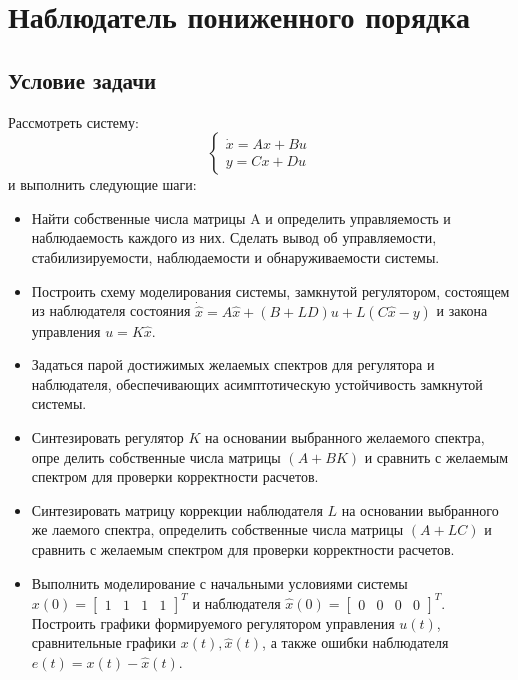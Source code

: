\chapter{Наблюдатель пониженного порядка}
\label{ch:chap4}

\section{Условие задачи}

Рассмотреть систему:
$$
  \begin{cases}
    \dot{x} = Ax + Bu \\
    y = Cx + Du
  \end{cases}
$$ и выполнить следующие шаги:

    \begin{itemize}
    \item Найти собственные числа матрицы A и определить управляемость и наблюдаемость каждого из них. 
    Сделать вывод об управляемости, стабилизируемости, наблюдаемости и обнаруживаемости системы.
    \item Построить схему моделирования системы, замкнутой регулятором, состоящем из наблюдателя состояния 
    $\dot{\hat{x}} = A\hat{x} + (B+LD)u + L(C\hat{x} - y)$ и закона управления $u = K\hat{x}$.
    \item Задаться парой достижимых желаемых спектров для регулятора и наблюдателя,
    обеспечивающих асимптотическую устойчивость замкнутой системы.
    \item Синтезировать регулятор $K$ на основании выбранного желаемого спектра, опре
    делить собственные числа матрицы $(A+BK)$ и сравнить с желаемым спектром
     для проверки корректности расчетов.
    \item Синтезировать матрицу коррекции наблюдателя $L$ на основании выбранного же
    лаемого спектра, определить собственные числа матрицы $(A +LC)$ и сравнить с
     желаемым спектром для проверки корректности расчетов.
     \item  Выполнить моделирование с начальными условиями системы
     $x(0) = \begin{bmatrix} 1 & 1 & 1 & 1\end{bmatrix}^T$ и наблюдателя 
     $\hat{x}(0) = \begin{bmatrix} 0 & 0 & 0 & 0 \end{bmatrix}^T$. Построить графики 
     формируемого регулятором управления $u(t)$, сравнительные графики $x(t), \hat{x}(t)$,
     а также ошибки наблюдателя $e(t) = x(t) - \hat{x}(t)$.
    
    
    \end{itemize}


